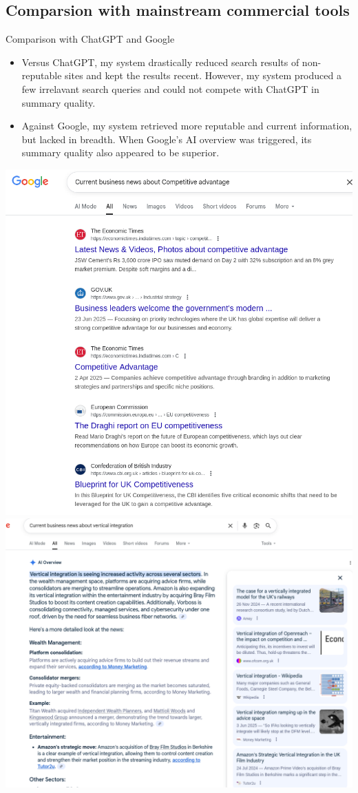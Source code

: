 \documentclass{beamer}
\begin{document}
\subsection{Comparsion with mainstream commercial tools}
\begin{frame}{Comparison with ChatGPT and Google}
\begin{itemize}
	\item Versus ChatGPT, my system drastically reduced search
		results of non-reputable sites and kept the results recent. However, my
		system produced a few irrelavant search queries and could not compete
		with ChatGPT in summary quality. 
	\item Against Google, my system retrieved more reputable and current
		information, but lacked in breadth. When Google's AI overview was
		triggered, its summary quality also appeared to be superior.
\end{itemize}
\begin{center}
	\includegraphics[height=.4\textheight]{../../deliverables/thesis/res/google_res1.png}
	\includegraphics[height=.4\textheight]{../../deliverables/thesis/res/google_res2.png}

\end{center}
\end{frame}
\end{document}
